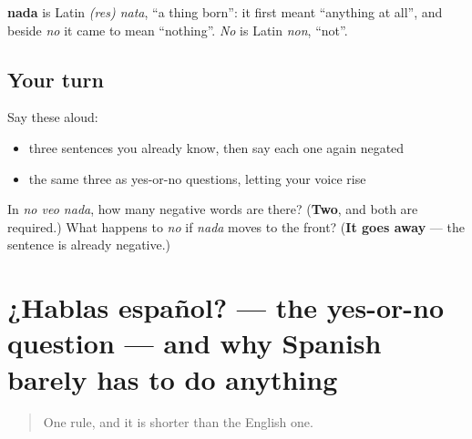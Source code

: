 \begin{cousinweb}
\textbf{nada} is Latin \emph{(res) nata}, \textquotedblleft{}a thing born\textquotedblright{}: it first meant \textquotedblleft{}anything at all\textquotedblright{}, and beside \emph{no} it came to mean \textquotedblleft{}nothing\textquotedblright{}. \emph{No} is Latin \emph{non}, \textquotedblleft{}not\textquotedblright{}.
\end{cousinweb}

\subsection*{Your turn}
Say these aloud:

\begin{itemize}
\raggedright
  \item three sentences you already know, then say each one again negated
  \item the same three as yes-or-no questions, letting your voice rise
\end{itemize}

\begin{tcolorbox}[breakable,colback=teal!4,colframe=teal!35!black,title={Before you move on}]
In \emph{no veo nada}, how many negative words are there? (\textbf{Two}, and both are required.) What happens to \emph{no} if \emph{nada} moves to the front? (\textbf{It goes away} — the sentence is already negative.)
\end{tcolorbox}
\section[¿Hablas español?]{¿Hablas español? — the yes-or-no question — and why Spanish barely has to do anything}

\label{lesson:ES-C267-pregunta-si-no}



\begin{quote}
One rule, and it is shorter than the English one.
\end{quote}

